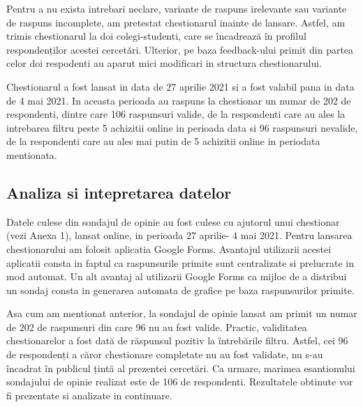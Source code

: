 \documentclass[a4paper, 12pt]{article}
\begin{document}
		\quad Pentru a nu exista intrebari neclare, variante de raspuns irelevante sau variante de raspuns incomplete, am pretestat chestionarul inainte de lansare. Astfel, am trimis chestionarul la doi colegi-studenti, care se încadrează în profilul respondenților acestei cercetări. Ulterior, pe baza feedback-ului primit din partea celor doi respodenti au aparut mici modificari in structura chestionarului.
		
		\quad Chestionarul a fost lansat in data de 27 aprilie 2021 si a fost valabil pana in data de 4 mai 2021. In aceasta perioada au raspuns la chestionar un numar de 202 de respondenti, dintre care 106 raspunsuri valide, de la respondenti care au ales la intrebarea filtru peste 5 achizitii online in perioada data si 96 raspunsuri nevalide, de la respondenti care au ales mai putin de 5 achizitii online in periodata mentionata.
	
		
	\subsection{Analiza si intepretarea datelor}
		\qquad Datele culese din sondajul de opinie au fost culese cu ajutorul unui chestionar (vezi Anexa 1), lansat online, in perioada 27 aprilie- 4 mai 2021. Pentru lansarea chestionarului am folosit aplicatia Google Forms. Avantajul utilizarii acestei aplicatii consta in faptul ca raspunsurile primite sunt centralizate si prelucrate in mod automat. Un alt avantaj al utilizarii Google Forms ca mijloc de a distribui un sondaj consta in generarea automata de grafice pe baza raspunsurilor primite. 
		
		\qquad Asa cum am mentionat anterior, la sondajul de opinie lansat am primit un numar de 202 de raspunsuri din care 96 nu au fost valide. Practic, validitatea chestionarelor a fost dată de răspunsul pozitiv la întrebările filtru. Astfel, cei 96 de respondenți a căror chestionare completate nu au fost validate, nu s-au încadrat în publicul țintă al prezentei cercetări.  Ca urmare, marimea esantionului sondajului de opinie realizat este de 106 de respondenti. Rezultatele obtinute vor fi prezentate si analizate in continuare.
		
\end{document}
